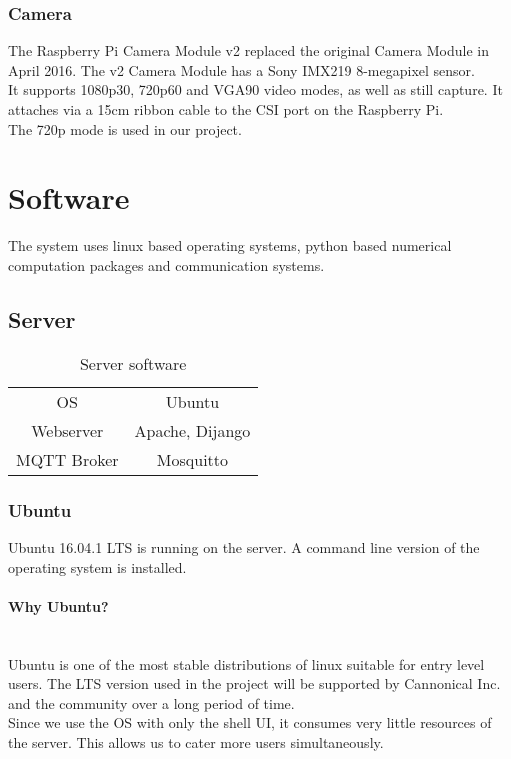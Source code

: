 \documentclass{report}
\begin{document}
\subsubsection{Camera}

The Raspberry Pi Camera Module v2 replaced the original Camera Module in April 2016. The v2 Camera Module has a Sony IMX219 8-megapixel sensor.\\
It supports 1080p30, 720p60 and VGA90 video modes, as well as still capture. It attaches via a 15cm ribbon cable to the CSI port on the Raspberry Pi.\\
 
 The 720p mode is used in our project.\\
 
 



\section{Software}

The system uses linux based operating systems, python based numerical computation packages and communication systems.

\subsection{Server}
\begin{table}[H]
    \centering
    \begin{tabular}{|c|c|}
        \hline
         OS             & Ubuntu \\
         Webserver      & Apache, Dijango\\
         MQTT Broker    & Mosquitto\\
         \hline
    \end{tabular}
    \caption{Server software}
    \label{tab:my_label}
\end{table}

\subsubsection{Ubuntu}
Ubuntu 16.04.1 LTS is running on the server. A command line version of the operating system is installed.

\paragraph{Why Ubuntu?}\\ %
Ubuntu is one of the most stable distributions of linux suitable for entry level users. The LTS version used in the project will be supported by Cannonical Inc. and the community over a long period of time.\\
Since we use the OS with only the shell UI, it consumes very little resources of the server. This allows us to cater more users simultaneously.\\
\end{document}
